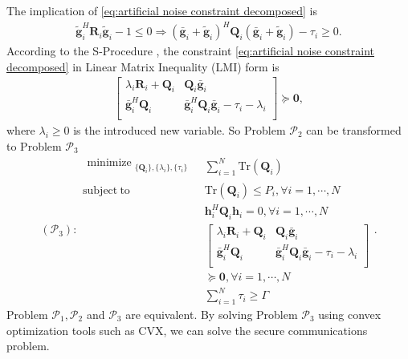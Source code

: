 \documentclass[conference]{IEEEtran}
\begin{document}
The implication of \eqref{eq:artificial noise constraint decomposed} is
\begin{eqnarray}
\tilde{\mathbf{g}}_i^H\mathbf{R}_i\tilde{\mathbf{g}} _i - 1\leq 0  \Rightarrow (\bar{\mathbf{g}}_i+\tilde{\mathbf{g}}_i)^H\mathbf{Q}_i(\bar{\mathbf{g}}_i+\tilde{\mathbf{g}}_i) - \tau_i \geq 0.
\end{eqnarray}
According to the S-Procedure \cite{ConvexOpt_Boyd}, the constraint \eqref{eq:artificial noise constraint decomposed}  in Linear Matrix Inequality (LMI) form is
\begin{eqnarray}
\left[ {\begin{array}{cc}
	\lambda_i\mathbf{R}_i+\mathbf{Q}_i  & \mathbf{Q}_i\bar{\mathbf{g}}_i \\
	\bar{\mathbf{g}}_i^H\mathbf{Q}_i& \bar{\mathbf{g}}_i^H\mathbf{Q}_i\bar{\mathbf{g}} _i- \tau_i -\lambda_i\\
	\end{array} } \right] \succeq \mathbf{0},
\end{eqnarray}
where $\lambda_i \geq 0$ is the introduced new variable. So Problem $\mathcal{P}_2$ can be transformed to Problem $\mathcal{P}_3$
\begin{equation}\label{eq:problem2}
(\mathcal{P}_{3}): \begin{array}{ll}
\begin{split}
\mathop{\text{minimize}}_{\substack{\{\mathbf{Q}_{i}\}, \{\lambda_i\},\{\tau_i\}}} 
\end{split}  
& \sum_{i=1}^N\mathrm{Tr}(\mathbf{Q}_i)\\
\mathrm{subject~to} &\mathrm{Tr}(\mathbf{Q}_i) \leq P_i, \forall i = 1, \cdots, N\\
& \mathbf{h}_i^H\mathbf{Q}_i\mathbf{h}_i= 0,\forall i = 1, \cdots, N\\
&\left[ {\begin{array}{cc}
	\lambda_i\mathbf{R}_i+\mathbf{Q}_i  & \mathbf{Q}_i\bar{\mathbf{g}}_i \\
	\bar{\mathbf{g}}_i^H\mathbf{Q}_i & \bar{\mathbf{g}}_i^H\mathbf{Q}_i\bar{\mathbf{g}}_i - \tau_i -\lambda_i\\
	\end{array} } \right] \\
&\succeq \mathbf{0},\forall i = 1, \cdots, N\\
&\sum_{i=1}^N \tau_i \geq \Gamma
\end{array}.
\end{equation}
Problem $\mathcal{P}_1, \mathcal{P}_2$ and $\mathcal{P}_3$ are equivalent. By solving Problem $\mathcal{P}_3$ using convex optimization tools such as CVX\cite{cvx}, we can solve the secure communications problem.
\end{document}
